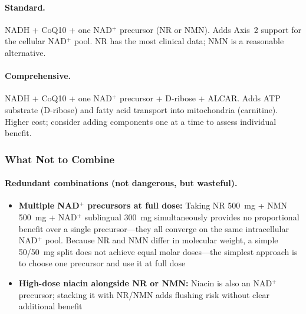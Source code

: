 \paragraph{Standard.} NADH + CoQ10 + one NAD$^+$ precursor (NR or NMN). Adds Axis~2 support for the cellular NAD$^+$ pool. NR has the most clinical data; NMN is a reasonable alternative.

\paragraph{Comprehensive.} NADH + CoQ10 + one NAD$^+$ precursor + D-ribose + ALCAR. Adds ATP substrate (D-ribose) and fatty acid transport into mitochondria (carnitine). Higher cost; consider adding components one at a time to assess individual benefit.

\subsubsection{What Not to Combine}

\paragraph{Redundant combinations (not dangerous, but wasteful).}
\begin{itemize}
    \item \textbf{Multiple NAD$^+$ precursors at full dose:} Taking NR 500~mg + NMN 500~mg + NAD$^+$ sublingual 300~mg simultaneously provides no proportional benefit over a single precursor---they all converge on the same intracellular NAD$^+$ pool. Because NR and NMN differ in molecular weight, a simple 50/50~mg split does not achieve equal molar doses---the simplest approach is to choose one precursor and use it at full dose
    \item \textbf{High-dose niacin alongside NR or NMN:} Niacin is also an NAD$^+$ precursor; stacking it with NR/NMN adds flushing risk without clear additional benefit
\end{itemize}

